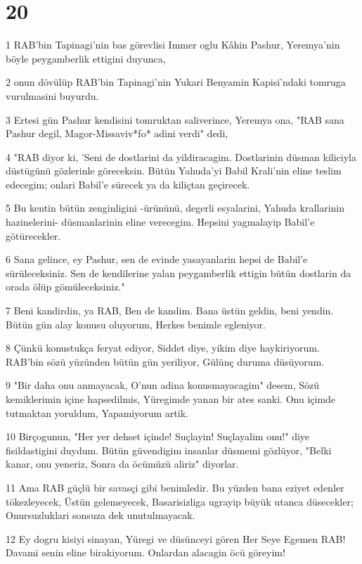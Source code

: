 \chapter{20}

\par 1 RAB'bin Tapinagi'nin bas görevlisi Immer oglu Kâhin Pashur, Yeremya'nin böyle peygamberlik ettigini duyunca,
\par 2 onun dövülüp RAB'bin Tapinagi'nin Yukari Benyamin Kapisi'ndaki tomruga vurulmasini buyurdu.
\par 3 Ertesi gün Pashur kendisini tomruktan saliverince, Yeremya ona, "RAB sana Pashur degil, Magor-Missaviv*fo* adini verdi" dedi,
\par 4 "RAB diyor ki, 'Seni de dostlarini da yildiracagim. Dostlarinin düsman kiliciyla düstügünü gözlerinle göreceksin. Bütün Yahuda'yi Babil Krali'nin eline teslim edecegim; onlari Babil'e sürecek ya da kiliçtan geçirecek.
\par 5 Bu kentin bütün zenginligini -ürününü, degerli esyalarini, Yahuda krallarinin hazinelerini- düsmanlarinin eline verecegim. Hepsini yagmalayip Babil'e götürecekler.
\par 6 Sana gelince, ey Pashur, sen de evinde yasayanlarin hepsi de Babil'e sürüleceksiniz. Sen de kendilerine yalan peygamberlik ettigin bütün dostlarin da orada ölüp gömüleceksiniz."
\par 7 Beni kandirdin, ya RAB, Ben de kandim. Bana üstün geldin, beni yendin. Bütün gün alay konusu oluyorum, Herkes benimle egleniyor.
\par 8 Çünkü konustukça feryat ediyor, Siddet diye, yikim diye haykiriyorum. RAB'bin sözü yüzünden bütün gün yeriliyor, Gülünç duruma düsüyorum.
\par 9 "Bir daha onu anmayacak, O'nun adina konusmayacagim" desem, Sözü kemiklerimin içine hapsedilmis, Yüregimde yanan bir ates sanki. Onu içimde tutmaktan yoruldum, Yapamiyorum artik.
\par 10 Birçogunun, "Her yer dehset içinde! Suçlayin! Suçlayalim onu!" diye fisildastigini duydum. Bütün güvendigim insanlar düsmemi gözlüyor, "Belki kanar, onu yeneriz, Sonra da öcümüzü aliriz" diyorlar.
\par 11 Ama RAB güçlü bir savasçi gibi benimledir. Bu yüzden bana eziyet edenler tökezleyecek, Üstün gelemeyecek, Basarisizliga ugrayip büyük utanca düsecekler; Onursuzluklari sonsuza dek unutulmayacak.
\par 12 Ey dogru kisiyi sinayan, Yüregi ve düsünceyi gören Her Seye Egemen RAB! Davami senin eline birakiyorum. Onlardan alacagin öcü göreyim!
